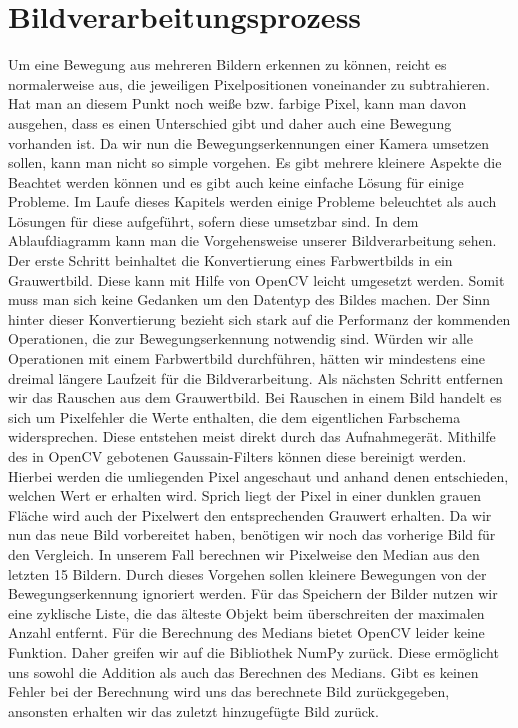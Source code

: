 \section{Bildverarbeitungsprozess}
Um eine Bewegung aus mehreren Bildern erkennen zu können, reicht es normalerweise aus, die jeweiligen Pixelpositionen voneinander zu subtrahieren. Hat man an diesem Punkt noch weiße bzw. farbige Pixel, kann man davon ausgehen, dass es einen Unterschied gibt und daher auch eine Bewegung vorhanden ist. Da wir nun die Bewegungserkennungen einer Kamera umsetzen sollen, kann man nicht so simple vorgehen. Es gibt mehrere kleinere Aspekte die Beachtet werden können und es gibt auch keine einfache Lösung für einige Probleme. Im Laufe dieses Kapitels werden einige Probleme beleuchtet als auch Lösungen für diese aufgeführt, sofern diese umsetzbar sind. 
In dem Ablaufdiagramm kann man die Vorgehensweise unserer Bildverarbeitung sehen. Der erste Schritt beinhaltet die Konvertierung eines Farbwertbilds in ein Grauwertbild. Diese kann mit Hilfe von OpenCV leicht umgesetzt werden. Somit muss man sich keine Gedanken um den Datentyp des Bildes machen. Der Sinn hinter dieser Konvertierung bezieht sich stark auf die Performanz der kommenden Operationen, die zur Bewegungserkennung notwendig sind. Würden wir alle Operationen mit einem Farbwertbild durchführen, hätten wir mindestens eine dreimal längere Laufzeit für die Bildverarbeitung.
Als nächsten Schritt entfernen wir das Rauschen aus dem Grauwertbild. Bei Rauschen in einem Bild handelt es sich um Pixelfehler die Werte enthalten, die dem eigentlichen Farbschema widersprechen. Diese entstehen meist direkt durch das Aufnahmegerät. Mithilfe des in OpenCV gebotenen Gaussain-Filters können diese bereinigt werden. Hierbei werden die umliegenden Pixel angeschaut und anhand denen entschieden, welchen Wert er erhalten wird. Sprich liegt der Pixel in einer dunklen grauen Fläche wird auch der Pixelwert den entsprechenden Grauwert erhalten.
Da wir nun das neue Bild vorbereitet haben, benötigen wir noch das vorherige Bild für den Vergleich. In unserem Fall berechnen wir Pixelweise den Median aus den letzten 15 Bildern. Durch dieses Vorgehen sollen kleinere Bewegungen von der Bewegungserkennung ignoriert werden. Für das Speichern der Bilder nutzen wir eine zyklische Liste, die das älteste Objekt beim überschreiten der maximalen Anzahl entfernt. Für die Berechnung des Medians bietet OpenCV leider keine Funktion. Daher greifen wir auf die Bibliothek NumPy zurück. Diese ermöglicht uns sowohl die Addition als auch das Berechnen des Medians. Gibt es keinen Fehler bei der Berechnung wird uns das berechnete Bild zurückgegeben, ansonsten erhalten wir das zuletzt hinzugefügte Bild zurück.
